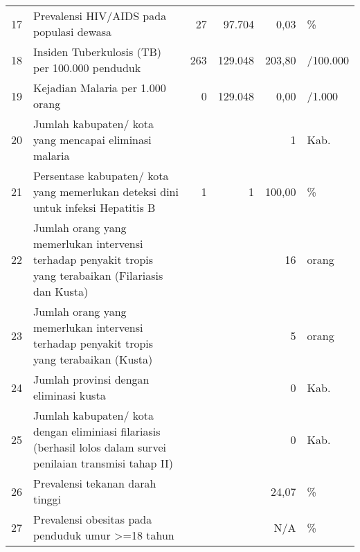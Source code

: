 \begin{center}
\begin{longtable}{rY{12em}rrrY{6em}}
                   17 & Prevalensi HIV/AIDS pada populasi dewasa                                                                                       					&      27 &  97.704 &   0,03 & \%                  \\
                   18 & Insiden Tuberkulosis (TB) per 100.000 penduduk                                                                                &     263 & 129.048 & 203,80 & /100.000            \\
                   19 & Kejadian Malaria per 1.000 orang                                                                                               					&       0 & 129.048 &   0,00 & /1.000              \\
                   20 & Jumlah kabupaten/ kota yang mencapai eliminasi malaria                                                                        &         &         &      1 & Kab.                \\
                   21 & Persentase kabupaten/ kota yang memerlukan deteksi dini untuk infeksi Hepatitis B                                              					&       1 &       1 & 100,00 & \%                  \\
                   22 & Jumlah orang yang memerlukan intervensi terhadap penyakit tropis yang terabaikan (Filariasis dan Kusta)                       &         &         &     16 & orang               \\
                   23 & Jumlah orang yang memerlukan intervensi terhadap penyakit tropis yang terabaikan (Kusta)                                       					&         &         &      5 & orang               \\
                   24 & Jumlah provinsi dengan eliminasi kusta                                                                                        &         &         &      0 & Kab.                \\
                   25 & Jumlah kabupaten/ kota dengan eliminiasi filariasis (berhasil lolos dalam survei penilaian transmisi tahap II)                 					&         &         &      0 & Kab.                \\
                   26 & Prevalensi tekanan darah tinggi                                                                                               &         &         &  24,07 & \%                  \\
                   27 & Prevalensi obesitas pada penduduk umur >=18 tahun                                                                              					&         &         &    N/A & \%                  \\

\end{longtable}
\end{center}

